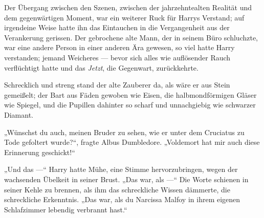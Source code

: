 %
Der Übergang zwischen den Szenen, zwischen der jahrzehntealten Realität und dem gegenwärtigen Moment, war ein weiterer Ruck für Harrys Verstand; auf irgendeine Weise hatte ihn das Eintauchen in die Vergangenheit aus der Verankerung gerissen. Der gebrochene alte Mann, der in seinem Büro schluchzte, war eine andere Person in einer anderen Ära gewesen, so viel hatte Harry verstanden; jemand Weicheres — bevor sich alles wie auflösender Rauch verflüchtigt hatte und das \emph{Jetzt}, die Gegenwart, zurückkehrte.

Schrecklich und streng stand der alte Zauberer da, als wäre er aus Stein gemeißelt; der Bart aus Fäden gewoben wie Eisen, die halbmondförmigen Gläser wie Spiegel, und die Pupillen dahinter so scharf und unnachgiebig wie schwarzer Diamant.

„Wünschst du auch, meinen Bruder zu sehen, wie er unter dem Cruciatus zu Tode gefoltert wurde?“, fragte Albus Dumbledore.
„Voldemort hat mir auch diese Erinnerung geschickt!“

„Und das —“ Harry hatte Mühe, eine Stimme hervorzubringen, wegen der wachsenden Übelkeit in seiner Brust.
„Das war, als —“
Die Worte schienen in seiner Kehle zu brennen, als ihm das schreckliche Wissen dämmerte, die schreckliche Erkenntnis.
„Das war, als du Narcissa Malfoy in ihrem eigenen Schlafzimmer lebendig verbrannt hast.“

